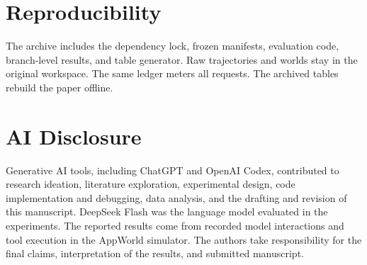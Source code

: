 \documentclass[conference]{IEEEtran}
\begin{document}


\section*{Reproducibility}
The archive includes the dependency lock, frozen manifests, evaluation code, branch-level results, and table generator. Raw trajectories and worlds stay in the original workspace. The same ledger meters all requests. The archived tables rebuild the paper offline.

\noindent\begin{minipage}{\columnwidth}
\section*{AI Disclosure}
Generative AI tools, including ChatGPT and OpenAI Codex, contributed to research ideation, literature exploration, experimental design, code implementation and debugging, data analysis, and the drafting and revision of this manuscript. DeepSeek Flash was the language model evaluated in the experiments. The reported results come from recorded model interactions and tool execution in the AppWorld simulator. The authors take responsibility for the final claims, interpretation of the results, and submitted manuscript.
\end{minipage}



\end{document}
